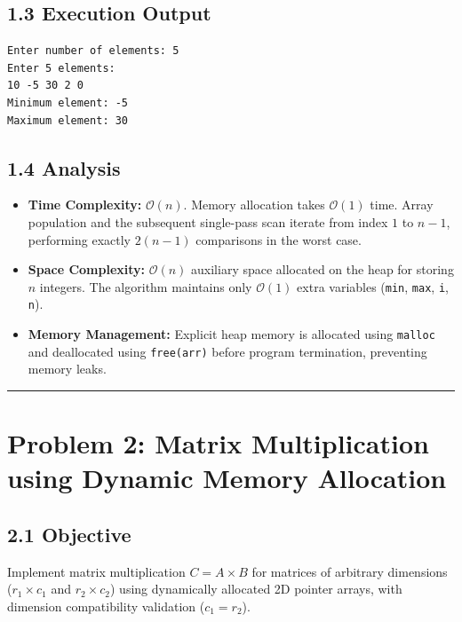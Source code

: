 \documentclass[12pt]{article}
\begin{document}
\subsection*{1.3 Execution Output}
\begin{lstlisting}[style=output]
Enter number of elements: 5
Enter 5 elements:
10 -5 30 2 0
Minimum element: -5
Maximum element: 30
\end{lstlisting}

\subsection*{1.4 Analysis}
\begin{itemize}
    \item \textbf{Time Complexity:} $\mathcal{O}(n)$. Memory allocation takes $\mathcal{O}(1)$ time. Array population and the subsequent single-pass scan iterate from index $1$ to $n-1$, performing exactly $2(n-1)$ comparisons in the worst case.
    \item \textbf{Space Complexity:} $\mathcal{O}(n)$ auxiliary space allocated on the heap for storing $n$ integers. The algorithm maintains only $\mathcal{O}(1)$ extra variables (\texttt{min}, \texttt{max}, \texttt{i}, \texttt{n}).
    \item \textbf{Memory Management:} Explicit heap memory is allocated using \texttt{malloc} and deallocated using \texttt{free(arr)} before program termination, preventing memory leaks.
\end{itemize}

\vspace{10pt}
\hrule
\vspace{10pt}

\section*{Problem 2: Matrix Multiplication using Dynamic Memory Allocation}

\subsection*{2.1 Objective}
Implement matrix multiplication $C = A \times B$ for matrices of arbitrary dimensions ($r_1 \times c_1$ and $r_2 \times c_2$) using dynamically allocated 2D pointer arrays, with dimension compatibility validation ($c_1 = r_2$).
\end{document}
